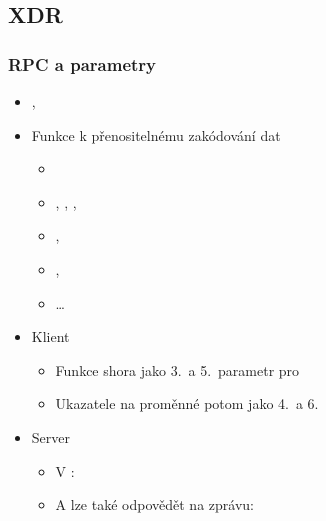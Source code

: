 \subsection{XDR}

\begin{frame}
  \frametitle{RPC a parametry}

  \begin{itemize}
    \item {}, 
    \item Funkce k přenositelnému zakódování dat
    \begin{itemize}
      \item {}
      \item {}, , , 
      \item {}, 
      \item {}, 
      \item \dots
    \end{itemize}

    \pause

    \item Klient
    \begin{itemize}
      \item Funkce shora jako 3.\ a 5.\ parametr pro 
      \item Ukazatele na proměnné potom jako 4.\ a 6.
    \end{itemize}

    \item Server
    \begin{itemize}
      \item V : 
      \item A lze také odpovědět na zprávu: 
    \end{itemize}
  \end{itemize}

\end{frame}

